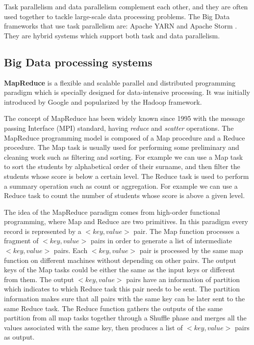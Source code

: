 \documentclass[	DIV=calc,%
							paper=a4,%
							fontsize=11pt,%
							twocolumn]{scrartcl}	 					%
\begin{document}
Task parallelism and data parallelism complement each other, and they are often used together to tackle large-scale data processing problems. The Big Data frameworks that use task parallelism are: Apache YARN \cite{3} and Apache Storm \cite{4}. They are hybrid systems which support both task and data parallelism.


\subsection*{Big Data processing systems}

\textbf{MapReduce} is a flexible and scalable parallel and distributed programming paradigm which is specially designed for data-intensive processing. It was initially introduced  by Google \cite{Dean:2004:MSD:1251254.1251264} and popularized by the Hadoop framework. 

The concept of MapReduce has been widely known since 1995 with the message passing Interface (MPI) \cite{MPI} standard, having \emph{reduce}  and \emph{scatter} operations. %
 The MapReduce programming model is composed of a Map procedure and a Reduce procedure. The Map task is usually used for performing some preliminary and cleaning work such as filtering and sorting. For example we can use a Map task to sort the students by alphabetical order of their surname, and then filter the students whose score is below a certain level. The Reduce task is used to perform a summary operation such as count or aggregation. For example we can use a Reduce task to count the number of students whose score is above a given level.  

The idea of the MapReduce paradigm comes from high-order functional programming, where Map and Reduce are two primitives. In this paradigm every record is represented by a $<key, value>$ pair. The Map function processes a fragment of $<key, value>$ pairs in order to generate a list of intermediate $<key, value>$ pairs. Each $<key, value>$ pair is processed by the same map function on different machines without depending on other pairs. The output keys of the Map tasks could be either the same as the input keys or different from them. The output $<key, value>$ pairs have an information of partition which indicates to which Reduce task this pair needs to be sent. The partition information makes sure that all pairs with the same key can be later sent to the same Reduce task. The Reduce function gathers the outputs of the same partition from all map tasks together through a Shuffle phase and merges all the values associated with the same key, then produces a list of $<key, value>$ pairs as output. 
\end{document}
